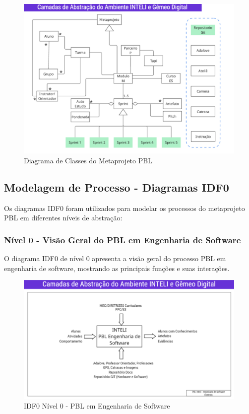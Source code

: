 \documentclass[english, spanish, brazilian]{RBIEarticle} %
\begin{document}
\begin{figure}[h]
	\centerline{\includegraphics[scale=0.6]{assets/modelo_de_classes.png}}
	\caption{Diagrama de Classes do Metaprojeto PBL}
	\label{fig:classes}
\end{figure}

\subsection{Modelagem de Processo - Diagramas IDF0}

Os diagramas IDF0 foram utilizados para modelar os processos do metaprojeto PBL em diferentes níveis de abstração:

\subsubsection{Nível 0 - Visão Geral do PBL em Engenharia de Software}

O diagrama IDF0 de nível 0 apresenta a visão geral do processo PBL em engenharia de software, mostrando as principais funções e suas interações.

\begin{figure}[h]
	\centerline{\includegraphics[scale=0.5]{assets/idf0_pbl_engsoft.png}}
	\caption{IDF0 Nível 0 - PBL em Engenharia de Software}
	\label{fig:idf0_nivel0}
\end{figure}
\end{document}
